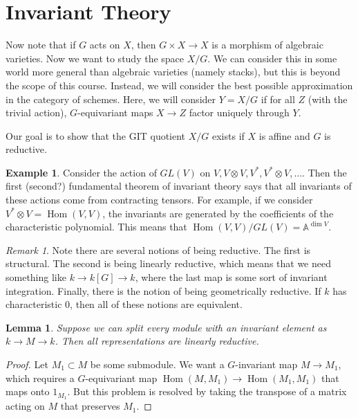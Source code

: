 \documentclass[leqno, openany]{memoir}
\newtheorem{lem}[thm]{Lemma}
\theoremstyle{definition}
\newtheorem{exm}[thm]{Example}
\theoremstyle{remark}
\newtheorem{rmk}[thm]{Remark}
\theoremstyle{plain}
\theoremstyle{definition}
\theoremstyle{remark}
\newcommand{\A}{\mathbb{A}}
\DeclareMathOperator{\Hom}{Hom}
\begin{document}
\section{Invariant Theory}%
\label{sec:invariant_theory}

Now note that if $G$ acts on $X$, then $G \times X \to X$ is a morphism of algebraic varieties. Now we want to study the space $X/G$. We can consider this in some world more general than algebraic varieties (namely stacks), but this is beyond the scope of this course. Instead, we will consider the best possible approximation in the category of schemes. Here, we will consider $Y = X / G$ if for all $Z$ (with the trivial action), $G$-equivariant maps $X \to Z$ factor uniquely through $Y$.

Our goal is to show that the GIT quotient $X/G$ exists if $X$ is affine and $G$ is reductive.

\begin{exm}
    Consider the action of $GL(V)$ on $V, V \otimes V, V^*, V^* \otimes V, \ldots$. Then the first (second?) fundamental theorem of invariant theory says that all invariants of these actions come from contracting tensors. For example, if we consider $V^* \otimes V = \Hom(V,V)$, the invariants are generated by the coefficients of the characteristic polynomial. This means that $\Hom(V,V) / GL(V) = \A^{\dim V}$.
\end{exm}

\begin{rmk}
    Note there are several notions of being reductive. The first is structural. The second is being linearly reductive, which means that we need something like $k \to k[G] \to k$, where the last map is some sort of invariant integration. Finally, there is the notion of being geometrically reductive. If $k$ has characteristic $0$, then all of these notions are equivalent.
\end{rmk}

\begin{lem}
    Suppose we can split every module with an invariant element as $k \to M \to k$. Then all representations are linearly reductive.
\end{lem}

\begin{proof}
    Let $M_1 \subset M$ be some submodule. We want a $G$-invariant map $M \to M_1$, which requires a $G$-equivariant map $\Hom(M, M_1) \to \Hom(M_1, M_1)$ that maps onto $1_{M_1}$. But this problem is resolved by taking the transpose of a matrix acting on $M$ that preserves $M_1$.
\end{proof}
\end{document}

